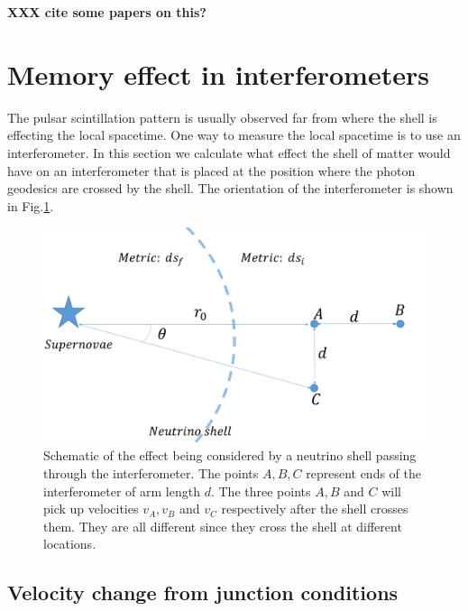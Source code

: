 \documentclass[aps,showpacs,onecolumn,floats,prd,superscriptaddress,nofootinbib]{revtex4-1}
\begin{document}
{\bf XXX cite some papers on this?}


\section{Memory effect in interferometers}
\label{RelV}

The pulsar scintillation pattern is usually observed far from where the shell is effecting the local spacetime. One way to measure the local spacetime is to use an interferometer. In this section we calculate what effect the shell of matter would have on an interferometer that is placed at the position where the photon geodesics are crossed by the shell.
The orientation of the interferometer is shown in Fig.\ref{fig:1}.

\begin{figure}[h!]
\begin{center}
\includegraphics[scale = 0.27]{intro.pdf}
\caption{Schematic of the effect being considered by a neutrino shell passing through the interferometer. The points $A,B,C$ represent ends of the interferometer of arm length $d$. The three points $A,B$ and $C$ will pick up velocities $v_A, v_B$ and $v_C$ respectively after the shell crosses them. They are all different since they cross the shell at different locations.}
\label{fig:1}
\end{center}
\end{figure}

\subsection{Velocity change from junction conditions}
\end{document}
